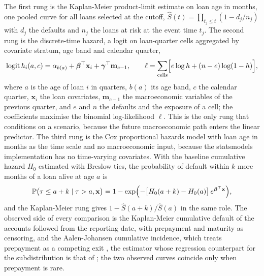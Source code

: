 The first rung is the Kaplan-Meier product-limit estimate on loan age in months, one pooled curve for all loans selected at the cutoff,
$\hat S(t)=\prod_{t_j\le t}(1-d_j/n_j)$ with $d_j$ the defaults and $n_j$ the loans at risk at the event time $t_j$. The second rung is the
discrete-time hazard, a logit on loan-quarter cells aggregated by covariate stratum, age band and calendar quarter,
\begin{equation}
\operatorname{logit} h_i(a,c)=\alpha_{b(a)}+\bm\beta^{\top}\mathbf{x}_i+\bm\gamma^{\top}\mathbf{m}_{c-1},\qquad
\ell=\sum_{\text{cells}}\Bigl[e\log h+(n-e)\log(1-h)\Bigr],
\label{eq:prov-dth}
\end{equation}
where $a$ is the age of loan $i$ in quarters, $b(a)$ its age band, $c$ the calendar quarter, $\mathbf{x}_i$ the loan covariates, $\mathbf{m}_{c-1}$ the macroeconomic
variables of the previous quarter, and $e$ and $n$ the defaults and the exposure of a cell; the coefficients maximise the binomial log-likelihood $\ell$. This is the
only rung that conditions on a scenario, because the future macroeconomic path enters the linear predictor. The third rung is the Cox
proportional hazards model with loan age in months as the time scale and no macroeconomic input, because the statsmodels implementation has no time-varying
covariates. With the baseline cumulative hazard $H_0$ estimated with Breslow ties, the probability of default within $k$ more months of a loan alive at age $a$ is
\begin{equation}
\mathbb{P}\bigl(\tau\le a+k\mid\tau>a,\mathbf{x}\bigr)=1-\exp\Bigl(-\bigl[H_0(a+k)-H_0(a)\bigr]\,e^{\bm\beta^{\top}\mathbf{x}}\Bigr),
\label{eq:prov-cox}
\end{equation}
and the Kaplan-Meier rung gives $1-\hat S(a+k)/\hat S(a)$ in the same role. The observed side of every comparison is the Kaplan-Meier cumulative default of the accounts
followed from the reporting date, with prepayment and maturity as censoring, and the Aalen-Johansen cumulative incidence, which treats prepayment as a competing exit
\citep{ratings:aalen1978}, the estimator whose regression counterpart for the subdistribution is that of \citet{provisions:fine1999}; the two observed curves coincide only when prepayment is rare.

